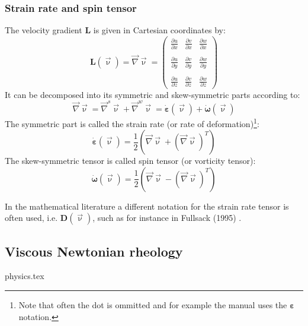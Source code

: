 \subsubsection{Strain rate and spin tensor} \label{ss:srst}

The velocity gradient ${\bm L}$ is given in Cartesian coordinates by:
\begin{equation}
{\bm L}(\vec\upnu)=
\vec\nabla\vec\upnu = 
\left(
\begin{array}{ccc}
\frac{\partial u}{\partial x} & \frac{\partial v}{\partial x} & \frac{\partial w}{\partial x} \\\\
\frac{\partial u}{\partial y} & \frac{\partial v}{\partial y} & \frac{\partial w}{\partial y} \\\\
\frac{\partial u}{\partial z} & \frac{\partial v}{\partial z} & \frac{\partial w}{\partial z} 
\end{array}
\right)
\end{equation}
It can be decomposed into its symmetric and skew-symmetric parts according to:
\begin{equation}
\vec\nabla\vec\upnu = \vec\nabla^s\vec\upnu + \vec\nabla^w\vec\upnu = \dot{\bm \varepsilon}(\vec \upnu) +  \dot{\bm \omega}(\vec \upnu)
\end{equation}
The symmetric part is called the strain rate (or rate of deformation)\footnote{Note that often the dot is ommitted and for example the \aspect manual uses the ${\bm \varepsilon}$ notation.}:
\begin{equation}
\dot{\bm \varepsilon}(\vec \upnu) = \frac{1}{2}\left( \vec\nabla\vec\upnu + (\vec\nabla\vec\upnu)^T \right)
\end{equation}
The skew-symmetric tensor is called spin tensor (or vorticity tensor):
\begin{equation}
\dot{\bm \omega}(\vec \upnu) = \frac{1}{2}\left( \vec\nabla\vec\upnu - (\vec\nabla\vec\upnu)^T \right)
\end{equation}

\begin{remark}
In the mathematical literature a different notation for the strain rate tensor is often used, i.e. 
${\bm D}(\vec \upnu)$, such as for instance in Fullsack (1995) \cite{full95}.
\end{remark}

\subsection{Viscous Newtonian rheology}
\begin{flushright} {\tiny {\color{gray} physics.tex}} \end{flushright}

